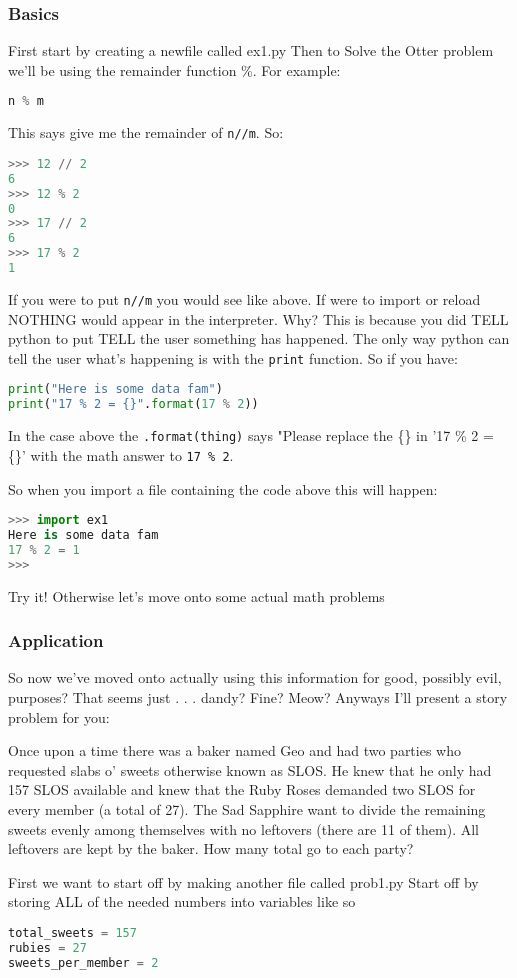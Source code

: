 \documentclass{article}
\begin{document}
\subsubsection{Basics}
First start by creating a newfile called ex1.py
Then to Solve the Otter problem we'll be using the remainder function \%. 
For example:
\begin{lstlisting}[language=Python]
n % m
\end{lstlisting}
This says give me the remainder of \verb|n//m|. So:
\begin{lstlisting}[language=Python]
>>> 12 // 2
6
>>> 12 % 2
0
>>> 17 // 2
6
>>> 17 % 2
1
\end{lstlisting}
If you were to put \verb|n//m| you would see like above.
If were to import or reload NOTHING would appear in the interpreter. 
Why?
This is because you did TELL python to put TELL the user something has 
happened.
The only way python can tell the user what's happening is with the \verb|print| 
function. 
So if you have:
\begin{lstlisting}[language=Python]
print("Here is some data fam")
print("17 % 2 = {}".format(17 % 2))
\end{lstlisting}
In the case above the \verb|.format(thing)| says "Please replace the \{\} in '17 \% 2 
= \{\}' with the math answer to \verb|17 % 2|.

So when you import a file containing the code above this will happen:
\begin{lstlisting}[language=Python]
>>> import ex1
Here is some data fam
17 % 2 = 1
>>>
\end{lstlisting}
Try it! 
Otherwise let's move onto some actual math problems

\subsubsection{Application}
So now we've moved onto actually using this information for good, possibly evil, purposes? 
That seems just . . . dandy? Fine? Meow? 
Anyways I'll present a story problem for you:
\begin{displayquote}
Once upon a time there was a baker named Geo and had two parties who requested slabs o' 
sweets otherwise known as SLOS.
He knew that he only had 157 SLOS available and knew that the Ruby Roses demanded 
two SLOS for every member (a total of 27). 
The Sad Sapphire want to divide the remaining sweets evenly among themselves with 
no leftovers (there are 11 of them).
All leftovers are kept by the baker.
How many total go to each party?
\end{displayquote}
First we want to start off by making another file called prob1.py
Start off by storing ALL of the needed numbers into variables like so
\begin{lstlisting}[language=Python]
total_sweets = 157
rubies = 27
sweets_per_member = 2
\end{lstlisting}
\end{document}
